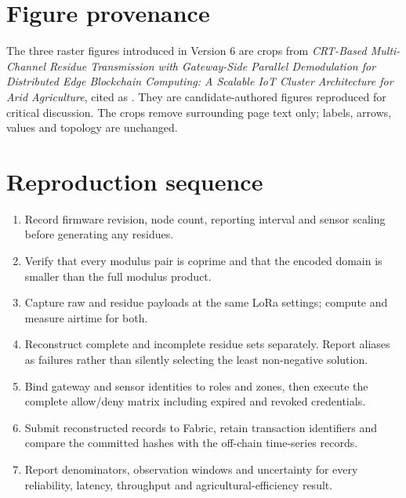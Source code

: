 \documentclass[12pt,a4paper,oneside]{book}
\begin{document}
\section*{Figure provenance}

The three raster figures introduced in Version 6 are crops from
\emph{CRT-Based Multi-Channel Residue Transmission with Gateway-Side Parallel
Demodulation for Distributed Edge Blockchain Computing: A Scalable IoT Cluster
Architecture for Arid Agriculture}, cited as
\cite{beloasone2025hrbac}. They are candidate-authored figures reproduced for
critical discussion. The crops remove surrounding page text only; labels,
arrows, values and topology are unchanged.

\section*{Reproduction sequence}

\begin{enumerate}
  \item Record firmware revision, node count, reporting interval and sensor
        scaling before generating any residues.
  \item Verify that every modulus pair is coprime and that the encoded domain
        is smaller than the full modulus product.
  \item Capture raw and residue payloads at the same LoRa settings; compute and
        measure airtime for both.
  \item Reconstruct complete and incomplete residue sets separately. Report
        aliases as failures rather than silently selecting the least
        non-negative solution.
  \item Bind gateway and sensor identities to roles and zones, then execute the
        complete allow/deny matrix including expired and revoked credentials.
  \item Submit reconstructed records to Fabric, retain transaction identifiers
        and compare the committed hashes with the off-chain time-series records.
  \item Report denominators, observation windows and uncertainty for every
        reliability, latency, throughput and agricultural-efficiency result.
\end{enumerate}
\end{document}
